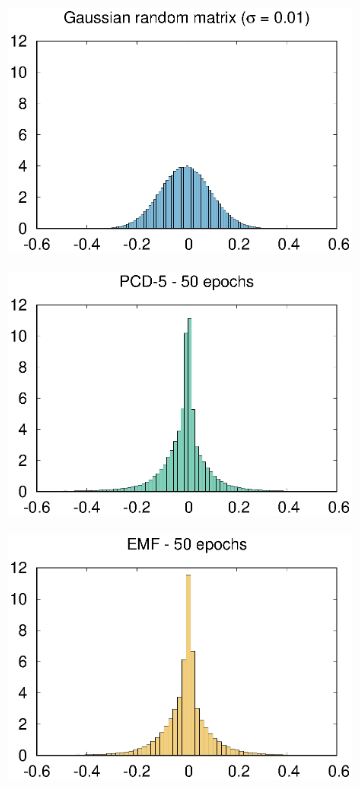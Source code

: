 \documentclass[notitlepage]{revtex4-1}
\begin{document}
\begin{figure}
  \centering
  \begin{subfigure}{.25\linewidth}
    \includegraphics[width=\linewidth]{w_init.eps}
    \caption{}
    \label{fig:w_init}
  \end{subfigure}
  \begin{subfigure}{.25\linewidth}
    \includegraphics[width=\linewidth]{w_pcd5_50.eps}
    \caption{}
    \label{fig:w_pcd5_50}
  \end{subfigure}
  \begin{subfigure}{.25\linewidth}
    \includegraphics[width=\linewidth]{w_tap20_50.eps}

\end{subfigure}
\end{figure}
\end{document}
